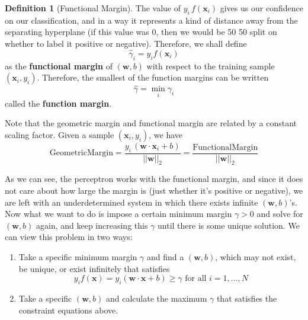 \documentclass{article}
\theoremstyle{definition}
\theoremstyle{remark}
\theoremstyle{definition}
\newtheorem{definition}{Definition}[section]
\begin{document}
\begin{definition}[Functional Margin]
  The value of $y_i \, f(\mathbf{x}_i)$ gives us our confidence on our classification, and in a way it represents a kind of distance away from the separating hyperplane (if this value was $0$, then we would be 50 50 split on whether to label it positive or negative). Therefore, we shall define 
  \begin{equation*}
      \hat{\gamma}_i = y_i f(\mathbf{x}_i) 
  \end{equation*}
as the \textbf{functional margin} of $(\mathbf{w}, b)$ with respect to the training sample $(\mathbf{x}_i, y_i)$. Therefore, the smallest of the function margins can be written 
\begin{equation*}
    \hat{\gamma} = \min_i \gamma_i 
\end{equation*}
called the \textbf{function margin}. 
\end{definition}

Note that the geometric margin and functional margin are related by a constant scaling factor. Given a sample $(\mathbf{x}_i, y_i)$, we have 
\begin{equation*}
    \mathrm{Geometric Margin} = \frac{y_i \, (\mathbf{w} \cdot \mathbf{x}_i + b)}{||\mathbf{w}||_2} = \frac{\mathrm{Functional Margin}}{||\mathbf{w}||_2}
\end{equation*}

As we can see, the perceptron works with the functional margin, and since it does not care about how large the margin is (just whether it's positive or negative), we are left with an underdetermined system in which there exists infinite $(\mathbf{w}, b)$'s. Now what we want to do is impose a certain minimum margin $\gamma > 0$ and solve for $(\mathbf{w}, b)$ again, and keep increasing this $\gamma$ until there is some unique solution. We can view this problem in two ways: 
\begin{enumerate} 
    \item Take a specific minimum margin $\gamma$ and find a $(\mathbf{w}, b)$, which may not exist, be unique, or exist infinitely that satisfies 
        \begin{equation*}
            y_i f(\mathbf{x}) = y_i ( \mathbf{w} \cdot \mathbf{x} + b) \geq \gamma \text{ for all } i = 1, \ldots, N 
        \end{equation*}
    \item Take a specific $(\mathbf{w}, b)$ and calculate the maximum $\gamma$ that satisfies the constraint equations above.  
\end{enumerate}
\end{document}
